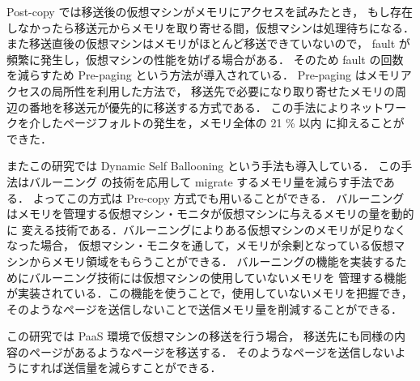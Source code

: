 \documentclass[graduation-thesis]{mlarticle}
\begin{document}
Post-copy では移送後の仮想マシンがメモリにアクセスを試みたとき，
もし存在しなかったら移送元からメモリを取り寄せる間，仮想マシンは処理待ちになる．
また移送直後の仮想マシンはメモリがほとんど移送できていないので，
fault が頻繁に発生し，仮想マシンの性能を妨げる場合がある．
そのため fault の回数を減らすため Pre-paging という方法が導入されている．
Pre-paging はメモリアクセスの局所性を利用した方法で，
移送先で必要になり取り寄せたメモリの周辺の番地を移送元が優先的に移送する方式である．
この手法によりネットワークを介したページフォルトの発生を，メモリ全体の 21 \% 以内
に抑えることができた．

またこの研究では Dynamic Self Ballooning という手法も導入している．
この手法はバルーニング \cite{Waldspurger:2002:MRM} の技術を応用して migrate するメモリ量を減らす手法である．
よってこの方式は Pre-copy 方式でも用いることができる．
バルーニングはメモリを管理する仮想マシン・モニタが仮想マシンに与えるメモリの量を動的に
変える技術である．バルーニングによりある仮想マシンのメモリが足りなくなった場合，
仮想マシン・モニタを通して，メモリが余剰となっている仮想マシンからメモリ領域をもらうことができる．
バルーニングの機能を実装するためにバルーニング技術には仮想マシンの使用していないメモリを
管理する機能が実装されている．この機能を使うことで，使用していないメモリを把握でき，
そのようなページを送信しないことで送信メモリ量を削減することができる．

この研究では PaaS 環境で仮想マシンの移送を行う場合，
移送先にも同様の内容のページがあるようなページを移送する．
そのようなページを送信しないようにすれば送信量を減らすことができる．
\end{document}
